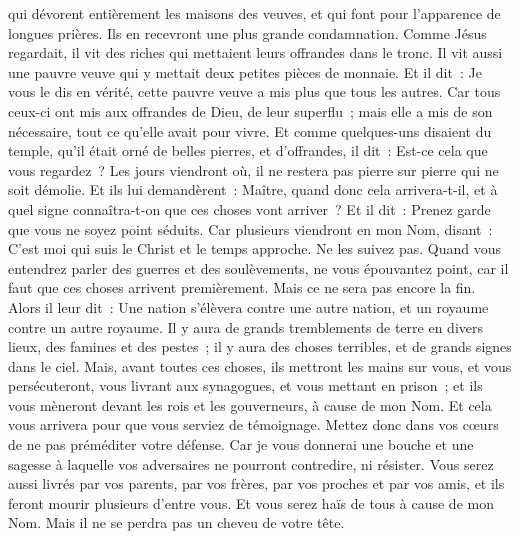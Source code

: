\begin{multicols}{2}
qui dévorent entièrement les maisons des veuves, et qui font pour l'apparence de longues prières. Ils en recevront une plus grande condamnation.
\VerseOne{}Comme Jésus regardait, il vit des riches qui mettaient leurs offrandes dans le tronc.
Il vit aussi une pauvre veuve qui y mettait deux petites pièces de monnaie.
Et il dit~: Je vous le dis en vérité, cette pauvre veuve a mis plus que tous les autres.
Car tous ceux-ci ont mis aux offrandes de Dieu, de leur superflu~; mais elle a mis de son nécessaire, tout ce qu'elle avait pour vivre.
Et comme quelques-uns disaient du temple, qu'il était orné de belles pierres, et d'offrandes, il dit~:
Est-ce cela que vous regardez~? Les jours viendront où, il ne restera pas pierre sur pierre qui ne soit démolie.
Et ils lui demandèrent~: Maître, quand donc cela arrivera-t-il, et à quel signe connaîtra-t-on que ces choses vont arriver~?
Et il dit~: Prenez garde que vous ne soyez point séduits. Car plusieurs viendront en mon Nom, disant~: C'est moi qui suis le Christ et le temps approche. Ne les suivez pas.
Quand vous entendrez parler des guerres et des soulèvements, ne vous épouvantez point, car il faut que ces choses arrivent premièrement. Mais ce ne sera pas encore la fin.
Alors il leur dit~: Une nation s'élèvera contre une autre nation, et un royaume contre un autre royaume.
Il y aura de grands tremblements de terre en divers lieux, des famines et des pestes~; il y aura des choses terribles, et de grands signes dans le ciel.
Mais, avant toutes ces choses, ils mettront les mains sur vous, et vous persécuteront, vous livrant aux synagogues, et vous mettant en prison~; et ils vous mèneront devant les rois et les gouverneurs, à cause de mon Nom.
Et cela vous arrivera pour que vous serviez de témoignage.
Mettez donc dans vos cœurs de ne pas préméditer votre défense.
Car je vous donnerai une bouche et une sagesse à laquelle vos adversaires ne pourront contredire, ni résister.
Vous serez aussi livrés par vos parents, par vos frères, par vos proches et par vos amis, et ils feront mourir plusieurs d'entre vous.
Et vous serez haïs de tous à cause de mon Nom.
Mais il ne se perdra pas un cheveu de votre tête.

\end{multicols}
